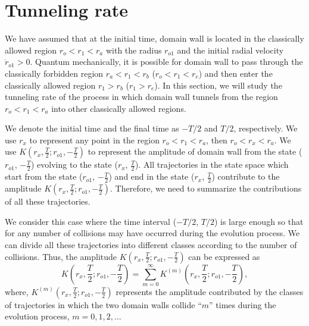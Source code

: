\documentclass[12pt]{article}
\begin{document}
\section{Tunneling rate}
\label{sec:4}

We have assumed that at the initial time, domain wall \uppercase\expandafter{} is located in the classically allowed region $r_{o}<r_{1}<r_{a}$ with the radius $r_{o1}$ and the initial radial velocity $\dot{r}_{o1}>0$. Quantum mechanically, it is possible for domain wall \uppercase\expandafter{} to pass  through the classically forbidden region $r_{a}<r_{1}<r_{b}$ ($r_{o}<r_{1}<r_{e}$) and then enter the classically allowed region $r_{1}>r_{b}$ ($r_{1}>r_{e}$). In this section, we will study the tunneling rate of the process in which domain wall \uppercase\expandafter{} tunnels from the region $r_{o}<r_{1}<r_{a}$ into other classically allowed regions.

We denote the initial time and the final time as $-T/2$ and $T/2$, respectively. We use $r_{x}$ to represent any point in the region  $r_{o}<r_{1}<r_{a}$, then $r_{o}<r_{x}<r_{a}$.
We use $K(r_{x},\frac{T}{2}; r_{o1}, -\frac{T}{2})$ to represent the amplitude of domain wall \uppercase\expandafter{} from the state ($r_{o1}$, $-\frac{T}{2}$) evolving to the state ($r_{x}$, $\frac{T}{2}$). All trajectories in the state space which start from the state ($r_{o1}$, $-\frac{T}{2}$) and end in the state ($r_{x}$, $\frac{T}{2}$) contribute to the amplitude $K(r_{x},\frac{T}{2}; r_{o1}, -\frac{T}{2})$. Therefore, we need to summarize the contributions of all these trajectories.

We consider this case where the time interval ($-T/2$, $T/2$) is large enough so that  for any number of collisions may have occurred during the evolution process. We can divide all these trajectories into different classes according to the number of collisions. Thus, the amplitude $K(r_{x},\frac{T}{2}; r_{o1}, -\frac{T}{2})$ can be expressed as
\begin{equation}
\label{eq:4.1}%
K(r_{x},\frac{T}{2}; r_{o1}, -\frac{T}{2})=\sum_{m=0}^{\infty}K^{(m)}(r_{x},\frac{T}{2}; r_{o1}, -\frac{T}{2}),
\end{equation}
where,  $K^{(m)}(r_{x},\frac{T}{2}; r_{o1}, -\frac{T}{2})$ represents the amplitude contributed by the classes of trajectories in which the two domain walls collide ``$m$'' times during the evolution process, $m=0,1,2,...$
\end{document}
